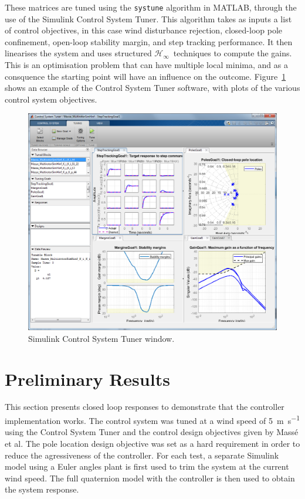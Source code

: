 \documentclass[a4paper,12pt]{article}
\newcommand{\hinf}{\mathcal{H}_\infty}
\newcommand{\Hinf}{\(\hinf\)}
\begin{document}
        These matrices are tuned using the \verb|systune| algorithm in MATLAB, through the use of the Simulink Control System Tuner. This algorithm takes as inputs a list of control objectives, in this case wind disturbance rejection, closed-loop pole confinement, open-loop stability margin, and step tracking performance. It then linearises the system and uses structured \Hinf\ techniques to compute the gains. This is an optimisation problem that can have multiple local minima, and as a consquence the starting point will have an influence on the outcome. Figure~\ref{fig:ctrl_systemtuner} shows an example of the Control System Tuner software, with plots of the various control system objectives.

        \begin{figure}[h!]
            \centering%
            \includegraphics[width=15cm]{ctrl_systemtuner.png}%
            \caption{Simulink Control System Tuner window.}\label{fig:ctrl_systemtuner}
        \end{figure}

    \newpage
    \section{Preliminary Results}

        This section presents closed loop responses to demonstrate that the controller implementation works. The control system was tuned at a wind speed of \SI{5}{\metre\per\second} using the Control System Tuner and the control design objectives given by Mass{\'e} et al. The pole location design objective was set as a hard requirement in order to reduce the agressiveness of the controller. For each test, a separate Simulink model using a Euler angles plant is first used to trim the system at the current wind speed. The full quaternion model with the controller is then used to obtain the system response.
\end{document}
